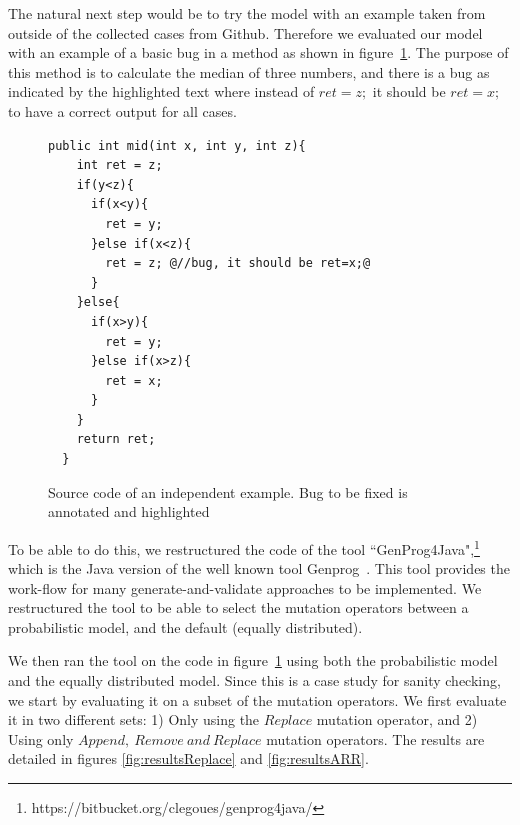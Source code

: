 \documentclass[conference]{IEEEtran}
\begin{document}
The natural next step would be to try the model with an example taken from 
outside of the collected cases from Github. Therefore we evaluated our model 
with an example of a basic bug in a method as shown in figure~\ref{fig:initialExample}. The purpose of this method is to calculate the median 
of three numbers, and there is a bug as indicated by the highlighted text where 
instead of $ret = z;$ it should be $ret = x;$ to have a correct output 
for all cases.


\begin{figure}[t]
\begin{lstlisting}[frame=single,style=base]
  public int mid(int x, int y, int z){
    int ret = z;  
    if(y<z){
      if(x<y){
        ret = y;
      }else if(x<z){
        ret = z; @//bug, it should be ret=x;@
      }
    }else{
      if(x>y){
        ret = y;
      }else if(x>z){
        ret = x;
      }
    }
    return ret;
  }	
	\end{lstlisting}
	\caption{Source code of an independent example. Bug to be fixed is annotated and highlighted}
	\label{fig:initialExample}
\end{figure}




To be able to do this, we restructured the code of the tool ``GenProg4Java",\footnote{https://bitbucket.org/clegoues/genprog4java/} which is the Java version of the 
well known tool Genprog~\cite{legoues12}. This tool provides the work-flow 
for many generate-and-validate approaches to be implemented. We restructured the 
tool to be able to select the mutation operators between a 
probabilistic model, and the default (equally distributed).

We then ran the tool on the code in figure~\ref{fig:initialExample} using both 
the probabilistic model and the equally distributed model. Since this is a 
case study for sanity checking, we start by evaluating it on a subset of 
the mutation operators. We first evaluate it in two different sets: 1) Only using the $Replace$ mutation operator, and 2) Using only $Append,~
Remove~and~Replace$ mutation operators. The results are detailed in figures 
\ref{fig:resultsReplace} and \ref{fig:resultsARR}. 
\end{document}
